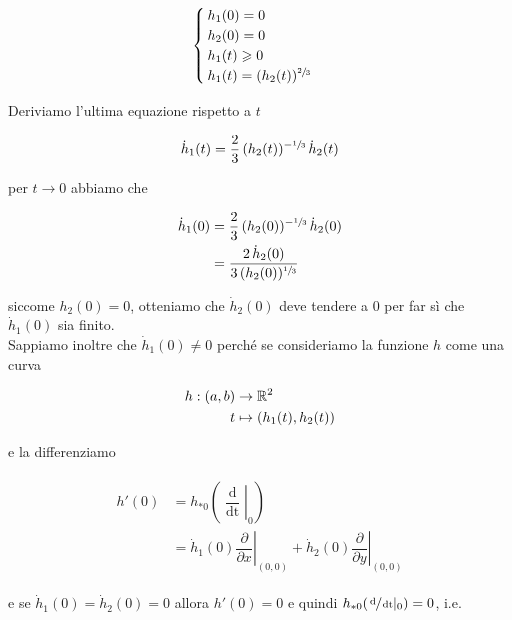 \begin{equation}
	\begin{cases}
		h_{1}(0) = 0\\
		h_{2}(0) = 0\\
		h_{1}(t) \geqslant 0\\
		h_{1}(t) = (h_{2}(t))^{\sfrac{2}{3}}
	\end{cases}
\end{equation}

Deriviamo l'ultima equazione rispetto a $ t $

\begin{equation}
	\dot{h}_{1}(t) = \dfrac{2}{3} \, (h_{2}(t))^{-\sfrac{1}{3}} \, \dot{h}_{2}(t)
\end{equation}

per $ t \to 0 $ abbiamo che

\begin{align}
	\begin{split}
		\dot{h}_{1}(0) &= \dfrac{2}{3} \, (h_{2}(0))^{-\sfrac{1}{3}} \, \dot{h}_{2}(0)\\
		&= \dfrac{2 \, \dot{h}_{2}(0)}{3 \, (h_{2}(0))^{\sfrac{1}{3}}}
	\end{split}	
\end{align}

siccome $ h_{2}(0)=0 $, otteniamo che $ \dot{h}_{2}(0) $ deve tendere a 0 per far sì che $ \dot{h}_{1}(0) $ sia finito.\\
Sappiamo inoltre che $ \dot{h}_{1}(0) \neq 0 $ perché se consideriamo la funzione $ h $ come una curva

\begin{align}
	\begin{split}
		h : (a,b) &\to \mathbb{R}^{2}\\
		t &\mapsto (h_{1}(t),h_{2}(t))
	\end{split}	
\end{align}

e la differenziamo

\begin{align}
	\begin{split}
		h'(0) &= h_{*0} \left( \left. \dfrac{\operatorname{d}}{\operatorname{dt}} \right|_{0} \right) \\
		&= \dot{h}_{1}(0) \left. \dfrac{\partial}{\partial x} \right|_{(0,0)} + \dot{h}_{2}(0) \left. \dfrac{\partial}{\partial y} \right|_{(0,0)}
	\end{split}
\end{align}

e se $ \dot{h}_{1}(0) = \dot{h}_{2}(0) = 0 $ allora $ h'(0) = 0 $ e quindi $ h_{*0} (\sfrac{\operatorname{d}}{\operatorname{dt}} |_{0} ) = 0 $, i.e.

